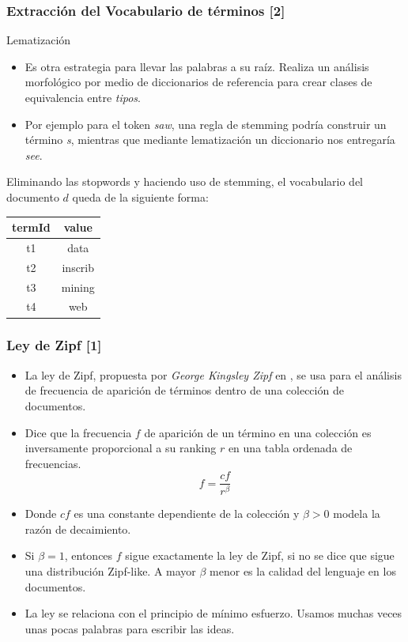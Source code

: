 \documentclass[handout]{beamer}
\begin{document}
\begin{frame}\frametitle{Extracción del Vocabulario de términos [2]}
\footnotesize{
 
\begin{block}{Lematización}
\begin{itemize}
 \item Es otra estrategia para llevar las palabras a su raíz. Realiza un análisis morfológico por medio de diccionarios de referencia para crear clases de equivalencia entre \emph{tipos}. 
\item Por ejemplo para el token \emph{saw}, una regla de stemming podría construir un término \emph{s}, mientras que mediante lematización un diccionario nos entregaría \emph{see}. 

\end{itemize}
\end{block}

Eliminando las stopwords y haciendo uso de stemming, el vocabulario del documento $d$ queda de la siguiente forma:

\begin{table}
\centering
\begin{tabular}{c|c}
\hline
termId & value \\ 
\hline
t1 & data \\ 
t2 & inscrib \\ 
t3 & mining \\ 
t4 & web \\ 
\hline
\end{tabular}
\end{table}

}
\end{frame}



\begin{frame}\frametitle{Ley de Zipf [1]}
\footnotesize{
\begin{itemize}
 \item La ley de Zipf, propuesta por \emph{George Kingsley Zipf} en \cite{zipf1935}, se usa para el análisis de frecuencia de aparición de términos dentro de una colección de documentos. 
\item Dice que la frecuencia $f$ de aparición de un término en una colección es inversamente proporcional a su ranking $r$ en una tabla ordenada de frecuencias.
\begin{equation}
	f = \frac{cf}{r^{\beta}}
\end{equation}
\item Donde $cf$ es una constante dependiente de la colección  y $\beta > 0$ modela la razón de decaimiento.
\item Si $\beta = 1$, entonces $f$ sigue exactamente la ley de Zipf, si no se dice que sigue una distribución Zipf-like. A mayor $\beta$ menor es la calidad del lenguaje en los documentos. 

\item La ley se relaciona con el principio de mínimo esfuerzo. Usamos muchas veces unas pocas palabras para escribir las ideas.

\end{itemize}


}
 
\end{frame}
\end{document}
